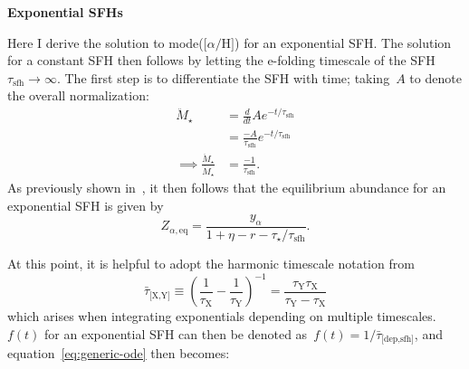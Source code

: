 \documentclass[12pt]{article}
\newcommand{\ah}{\ensuremath{\text{[$\alpha$/H]}}}
\newcommand{\timescale}[1]{\ensuremath{\tau_\text{#1}}}
\newcommand{\harmonic}[2]{\ensuremath{\bar{\tau}_\text{[#1,#2]}}}
\begin{document}
\par\null\par\noindent
{\large \textbf{Exponential SFHs}}
\par\noindent
Here I derive the solution to mode(\ah) for an exponential SFH.
The solution for a constant SFH then follows by letting the e-folding timescale
of the SFH~$\timescale{sfh} \rightarrow \infty$.
The first step is to differentiate the SFH with time; taking~$A$ to denote
the overall normalization:
\begin{subequations}\begin{align}
\ddot{M}_\star &= \frac{d}{dt} A e^{-t / \timescale{sfh}}
\\
&= \frac{-A}{\timescale{sfh}} e^{-t / \timescale{sfh}}
\\
\implies \frac{\ddot{M}_\star}{\dot{M}_\star} &= \frac{-1}{\timescale{sfh}}.
\end{align}\end{subequations}
As previously shown in~\citet*{Weinberg2017}, it then follows that the
equilibrium abundance for an exponential SFH is given by
\begin{equation}
Z_{\alpha,\text{eq}} = \frac{y_\alpha}{
	1 + \eta - r - \tau_\star / \timescale{sfh}
}.
\label{eq:zeq-expsfh}
\end{equation}
\par
At this point, it is helpful to adopt the harmonic timescale notation from
\citet*{Weinberg2017}
\begin{equation}
\harmonic{X}{Y} \equiv \left(\frac{1}{\timescale{X}} -
\frac{1}{\timescale{Y}}\right)^{-1} = \frac{
	\timescale{Y}\timescale{X}
}{
	\timescale{Y} - \timescale{X}
}
\end{equation}
which arises when integrating exponentials depending on multiple timescales.
$f(t)$ for an exponential SFH can then be denoted as~$f(t) = 1 /
\harmonic{dep}{sfh}$, and equation~\ref{eq:generic-ode} then becomes:
\end{document}
